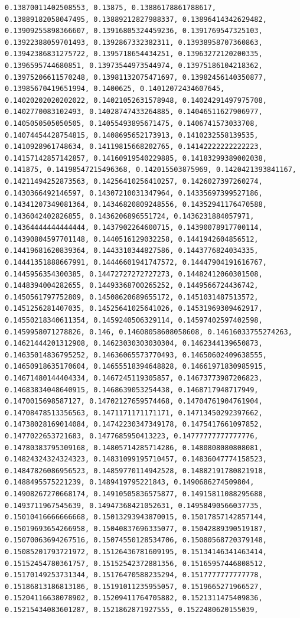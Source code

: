 \documentclass[11pt]{article}
\begin{document}
\begin{Verbatim}[commandchars=\\\{\}]
0.13870011402508553, 0.13875, 0.13886178861788617, 0.13889182058047495, 0.13889212827988337, 0.13896414342629482, 0.13909255898366607, 0.13916805324459236, 0.1391769547325103, 0.13922388059701493, 0.1392867332382311, 0.13938958707360863, 0.13942386831275722, 0.1395718654434251, 0.13963272120200335, 0.1396595744680851, 0.13973544973544974, 0.13975186104218362, 0.13975206611570248, 0.13981132075471697, 0.13982456140350877, 0.13985670419651994, 0.1400625, 0.14012072434607645, 0.14020202020202022, 0.14021052631578948, 0.14024291497975708, 0.1402770083102493, 0.14028747433264885, 0.14046511627906977, 0.1405050505050505, 0.14055493895671475, 0.1406741573033708, 0.14074454428754815, 0.1408695652173913, 0.1410232558139535, 0.1410928961748634, 0.14119815668202765, 0.14142222222222223, 0.14157142857142857, 0.14160919540229885, 0.14183299389002038, 0.141875, 0.14198547215496368, 0.142015503875969, 0.1420421393841167, 0.14211494252873563, 0.14256410256410257, 0.1426027397260274, 0.1430366492146597, 0.14307210031347964, 0.14335697399527186, 0.14341207349081364, 0.14346820809248556, 0.14352941176470588, 0.1436042402826855, 0.1436206896551724, 0.1436231884057971, 0.14364444444444444, 0.1437902264600715, 0.14390078917700114, 0.14390804597701148, 0.1440516129032258, 0.1441942604856512, 0.14419681620839364, 0.1443310344827586, 0.1443776824034335, 0.14441351888667991, 0.14446601941747572, 0.14447904191616767, 0.1445956354300385, 0.14472727272727273, 0.14482412060301508, 0.1448394004282655, 0.14493368700265252, 0.1449566724436742, 0.1450561797752809, 0.14508620689655172, 0.1451031487513572, 0.1451256281407035, 0.14525641025641026, 0.14531969309462917, 0.14550218340611354, 0.1459240506329114, 0.14597402597402598, 0.1459958071278826, 0.146, 0.14608058608058608, 0.14616033755274263, 0.14621444201312908, 0.14623030303030304, 0.1462344139650873, 0.14635014836795252, 0.14636065573770493, 0.14650602409638555, 0.14650918635170604, 0.14655518394648828, 0.14661971830985915, 0.14671480144404334, 0.1467245119305857, 0.14673773987206823, 0.14683834048640915, 0.1468639053254438, 0.1468717948717949, 0.1470015698587127, 0.14702127659574468, 0.14704761904761904, 0.14708478513356563, 0.1471171171171171, 0.14713450292397662, 0.14738028169014084, 0.14742230347349178, 0.1475417661097852, 0.1477022653721683, 0.1477685950413223, 0.14777777777777776, 0.14780383795309168, 0.14805714285714286, 0.1480808080808081, 0.14824324324324323, 0.14831099195710457, 0.14836047774158523, 0.14847826086956523, 0.14859770114942528, 0.14882191780821918, 0.1488495575221239, 0.1489419795221843, 0.1490686274509804, 0.14908267270668174, 0.14910505836575877, 0.14915811088295688, 0.1493711967545639, 0.14947368421052631, 0.14958490566037735, 0.15010416666666668, 0.15013293943870015, 0.15017857142857144, 0.15019693654266958, 0.15040837696335077, 0.15042889390519187, 0.15070063694267516, 0.15074550128534706, 0.15080568720379148, 0.15085201793721972, 0.15126436781609195, 0.15134146341463414, 0.15152454780361757, 0.15152542372881356, 0.15165957446808512, 0.15170149253731344, 0.15176470588235294, 0.1517777777777778, 0.15186813186813186, 0.15191011235955057, 0.1519665271966527, 0.15204116638078902, 0.15209411764705882, 0.1521311475409836, 0.15215434083601287, 0.1521862871927555, 0.1522480620155039, 
\end{Verbatim}
\end{document}
